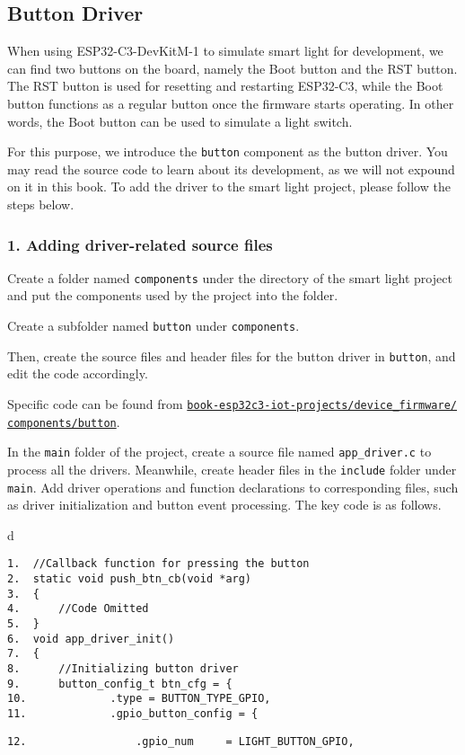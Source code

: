 \documentclass[a4paper,12pt]{book}
\begin{document}
\subsection{Button Driver}
When using ESP32-C3-DevKitM-1 to simulate smart light for development, we can find two buttons on the board, namely the Boot button and the RST button. The RST button is used for resetting and restarting ESP32-C3, while the Boot button functions as a regular button once the firmware starts operating. In other words, the Boot button can be used to simulate a light switch.

For this purpose, we introduce the \verb|button| component as the button driver. You may read the source code to learn about its development, as we will not expound on it in this book. To add the driver to the smart light project, please follow the steps below.

\subsubsection{1. Adding driver-related source files}
Create a folder named \verb|components| under the directory of the smart light project and put the components used by the project into the folder.

Create a subfolder named \verb|button| under \verb|components|.

Then, create the source files and header files for the button driver in \verb|button|, and edit the code accordingly.

Specific code can be found from \href{https://github.com/espressif/book-esp32c3-iot-projects/tree/main/device_firmware/components/button}{\texttt{book-esp32c3-iot-projects/device\_firmware/\\ components/button}}.

In the \verb|main| folder of the project, create a source file named \verb|app_driver.c| to process all the drivers. Meanwhile, create header files in the \verb|include| folder under \verb|main|. Add driver operations and function declarations to corresponding files, such as driver initialization and button event processing. The key code is as follows.

\begin{codebloc}
\begin{tabular}{d}
\vspace{2pt}
\begin{verbatim}
1.  //Callback function for pressing the button
2.  static void push_btn_cb(void *arg)
3.  {
4.      //Code Omitted
5.  }
6.  void app_driver_init()
7.  {
8.      //Initializing button driver
9.      button_config_t btn_cfg = {
10.             .type = BUTTON_TYPE_GPIO,
11.             .gpio_button_config = {
\end{verbatim}
\verb|12.                 .gpio_num     = LIGHT_BUTTON_GPIO,|
\end{tabular}
\end{codebloc}
\end{document}
